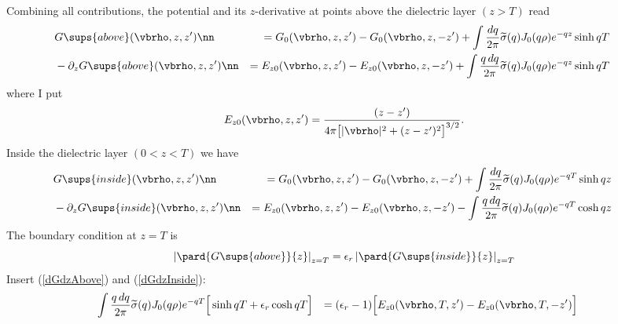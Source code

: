 \documentclass[letterpaper]{article}
\renewcommand{\wt}{\widetilde}
\begin{document}
Combining all contributions, the 
potential and its $z$-derivative at points above the dielectric layer $(z>T)$
read
\begin{align}
&\hspace{-0.3in}G\sups{above}(\vbrho, z, z^\prime)
\nn
  &= G_0(\vbrho, z, z^\prime) - G_0(\vbrho, z, -z^\prime)
    + \int \frac{dq}{2\pi} \wt\sigma(q) J_0(q\rho) e^{-qz} \sinh qT
\label{GAbove}\\
&\hspace{-0.3in} -\partial_z G\sups{above}(\vbrho, z, z^\prime)
\nn
  &= E_{z0}(\vbrho, z, z^\prime) - E_{z0}(\vbrho, z, -z^\prime)
    + \int \frac{q\,dq}{2\pi} \wt\sigma(q) J_0(q\rho) e^{-qz} \sinh qT
\label{dGdzAbove}
\end{align}
where I put
$$ E_{z0}(\vbrho, z, z^\prime)
   =\frac{(z-z^\prime)}{4\pi\big[|\vbrho|^2 + (z-z^\prime)^2\big]^{3/2}}.
$$
Inside the dielectric layer $(0<z<T)$ we have
\begin{align}
&\hspace{-0.3in}G\sups{inside}(\vbrho, z, z^\prime)
\nn
  &= G_0(\vbrho, z, z^\prime) - G_0(\vbrho, z, -z^\prime)
    + \int \frac{dq}{2\pi} \wt\sigma(q)J_0(q\rho) e^{-qT}\sinh qz
\label{GInside} \\
&\hspace{-0.3in} -\partial_z G\sups{inside}(\vbrho, z, z^\prime)
\nn
  &= E_{z0}(\vbrho, z, z^\prime) - E_{z0}(\vbrho, z, -z^\prime)
    - \int \frac{q\,dq}{2\pi}\wt\sigma(q)J_0(q\rho) e^{-qT}\cosh qz
\label{dGdzInside}
\end{align}
The boundary condition at $z=T$ is 
$$            \left|\pard{G\sups{above}}{z}\right|_{z=T} = 
   \epsilon_r \left|\pard{G\sups{inside}}{z}\right|_{z=T} 
$$
Insert (\ref{dGdzAbove}) and (\ref{dGdzInside}):
\begin{align*}
&\hspace{-0.2in}
\int \frac{q\,dq}{2\pi} 
  \wt \sigma(q) J_0(q\rho) e^{-qT}\Big[\sinh qT + \epsilon_r \cosh qT\Big]
&=(\epsilon_r-1)
  \Big[ E_{z0}(\vbrho,T,z^\prime)-E_{z0}(\vbrho,T,-z^\prime)\Big]
\end{align*}
\end{document}
